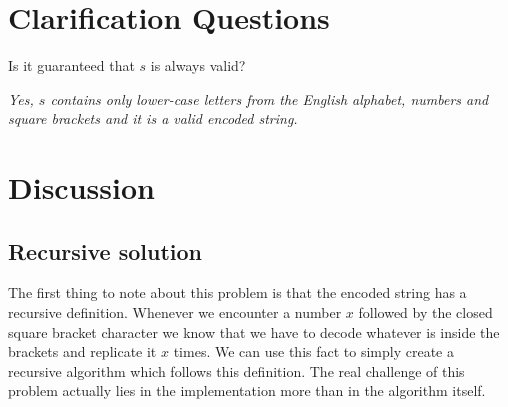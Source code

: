 \section{Clarification Questions}

\begin{QandA}
	\item \begin{questionitem} \begin{question} Is it guaranteed that $s$ is always valid?  \end{question} 	 
    \begin{answered}
		\textit{Yes, $s$ contains only lower-case letters from the English alphabet, numbers and square brackets and it is a valid encoded string.}
	\end{answered} \end{questionitem}

\end{QandA}

\section{Discussion}
\label{decode_string:sec:discussion}


\subsection{Recursive solution}
\label{decode_string:sec:recursive}
The first thing to note about this problem is that the encoded string has a recursive definition.
Whenever we encounter a number $x$ followed by the closed square bracket character  \inline{'['} 
we know that we have
to decode whatever is inside the brackets and replicate it $x$ times.
We can use this fact to simply create a recursive algorithm which follows this definition.
The real challenge of this problem actually lies in the implementation more than in the algorithm itself.

